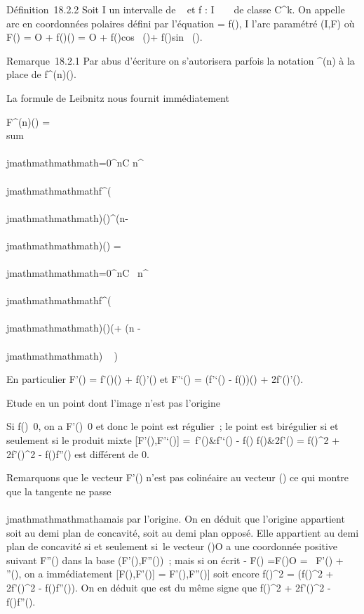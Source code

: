 Définition~18.2.2 Soit I un intervalle de ~ et f : I \rightarrow~ ~ de classe
C^k. On appelle arc en coordonnées polaires défini par
l'équation \rho = f(\theta), \theta \in I l'arc paramétré (I,F) où F(\theta) = O +
f(\theta)\vecu(\theta) = O + f(\theta)cos~
(\theta)\vec\imath + f(\theta)sin~
(\theta).

Remarque~18.2.1 Par abus d'écriture on s'autorisera parfois la notation
\rho^(n) à la place de f^(n)(\theta).

La formule de Leibnitz nous fournit immédiatement

F^(n)(\theta) = \\sum
\\\\jmathmathmathmath=0^nC
n^\\\\jmathmathmathmathf^(\\\\jmathmathmathmath)(\theta)\vecu^(n-\\\\jmathmathmathmath)(\theta)
= \sum \\\\jmathmathmathmath=0^nC~
n^\\\\jmathmathmathmathf^(\\\\jmathmathmathmath)(\theta)\vecu(\theta + (n - \\\\jmathmathmathmath) \pi~
 )

En particulier F'(\theta) = f'(\theta)\vecu(\theta) +
f(\theta)\vecu'(\theta) et F'`(\theta) = (f'`(\theta) -
f(\theta))\vecu(\theta) + 2f'(\theta)\vecu'(\theta).

Etude en un point dont l'image n'est pas l'origine

Si f(\theta)\neq~0, on a
F'(\theta)\neq~0 et donc le point est régulier~; le
point est birégulier si et seulement si le produit mixte
{[}F'(\theta),F'`(\theta){]} = \left
\textbar{}\matrix\,f'(\theta)&f'`(\theta) - f(\theta)
\cr f(\theta)&2f'(\theta) \right \textbar{} =
f(\theta)^2 + 2f'(\theta)^2 - f(\theta)f''(\theta) est différent de 0.

Remarquons que le vecteur F'(\theta) n'est pas colinéaire au vecteur
\overrightarrowOF(\theta) ce qui montre que la tangente ne
passe \\\\jmathmathmathmathamais par l'origine. On en déduit que l'origine appartient soit
au demi plan de concavité, soit au demi plan opposé. Elle appartient au
demi plan de concavité si et seulement si~le vecteur
\overrightarrowF(\theta)O a une coordonnée positive
suivant F''(\theta) dans la base (F'(\theta),F''(\theta))~; mais si on écrit - F(\theta)
=\overrightarrow F(\theta)O = \lambda~F'(\theta) + \muF''(\theta), on a
immédiatement {[}F(\theta),F'(\theta){]} = \mu{[}F'(\theta),F''(\theta){]} soit encore
f(\theta)^2 = \mu(f(\theta)^2 + 2f'(\theta)^2 -
f(\theta)f''(\theta)). On en déduit que \mu est du même signe que f(\theta)^2
+ 2f'(\theta)^2 - f(\theta)f''(\theta).

